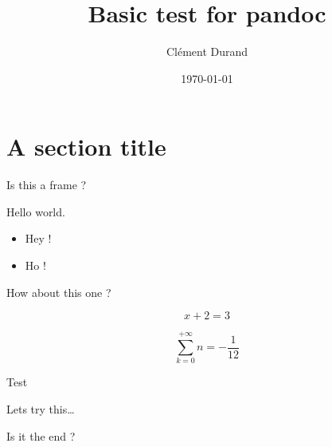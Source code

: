 \documentclass[aspectratio=169]{beamer}
\title[How well does it work ?]{Basic test for pandoc}
\author{Clément Durand}
\date{\today}
\providecommand{\tightlist}{%
  \setlength{\itemsep}{0pt}\setlength{\parskip}{0pt}}
\begin{document}
\maketitle

\section{A section title}\label{a-section-title}

\begin{frame}{Is this a frame ?}

Hello world.

\begin{itemize}
\tightlist
\item
  Hey !
\item
  Ho !
\end{itemize}

\end{frame}

\begin{frame}{How about this one ?}

\[x+2=3\]

\[\sum_{k=0}^{+\infty}{n}=-\frac1{12}\]

\begin{block}{Test}

Lets try this\ldots{}

Is it the end ?

\end{block}

\end{frame}
\end{document}
